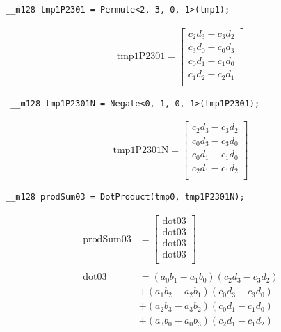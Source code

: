 \documentclass[fontsize = 10pt,DIV = 13]{scrartcl}
\newcommand{\pth}[1]{\left(#1\right)}
\begin{document}
\begin{verbatim}
__m128 tmp1P2301 = Permute<2, 3, 0, 1>(tmp1);
\end{verbatim}

\begin{align*}
\mathrm{tmp1P2301} 
=
\begin{bmatrix}
c_2d_3 - c_3d_2\\
c_3d_0 - c_0d_3\\
c_0d_1 - c_1d_0\\
c_1d_2 - c_2d_1\\
\end{bmatrix}
\end{align*}

\begin{verbatim}
 __m128 tmp1P2301N = Negate<0, 1, 0, 1>(tmp1P2301);
\end{verbatim}

\begin{align*}
\mathrm{tmp1P2301N} 
=
\begin{bmatrix}
c_2d_3 - c_3d_2\\
c_0d_3 - c_3d_0\\
c_0d_1 - c_1d_0\\
c_2d_1 - c_1d_2\\
\end{bmatrix}
\end{align*}

\begin{verbatim}
__m128 prodSum03 = DotProduct(tmp0, tmp1P2301N);
\end{verbatim}

\begin{align*}
\mathrm{prodSum03} 
&=
\begin{bmatrix}
\mathrm{dot03}\\
\mathrm{dot03}\\
\mathrm{dot03}\\
\mathrm{dot03}\\
\end{bmatrix}\\
\\
\mathrm{dot03}
&= \pth{a_0b_1 - a_1b_0} \pth{c_2d_3 - c_3d_2}\\
&+ \pth{a_1b_2 - a_2b_1} \pth{c_0d_3 - c_3d_0}\\
&+ \pth{a_2b_3 - a_3b_2} \pth{c_0d_1 - c_1d_0}\\
&+ \pth{a_3b_0 - a_0b_3} \pth{c_2d_1 - c_1d_2}\\
\end{align*}
\end{document}
